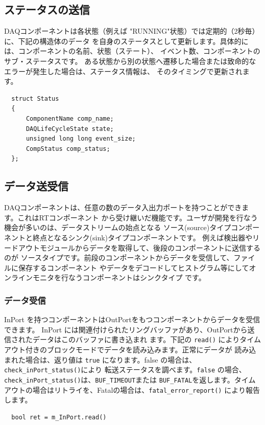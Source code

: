 \documentclass[a4j,10pt,dvips,onecolumn,oneside,final]{jarticle}%
\begin{document}
\subsection{ステータスの送信}
DAQコンポーネントは各状態（例えば "RUNNING"状態）では定期的（2秒毎）に、下記の構造体のデータ
を自身のステータスとして更新します。具体的には、コンポーネントの名前、状態（ステート）、
イベント数、コンポーネントのサブ・ステータスです。
ある状態から別の状態へ遷移した場合または致命的なエラーが発生した場合は、ステータス情報は、
そのタイミングで更新されます。

\begin{Verbatim}
  struct Status
  {
      ComponentName comp_name;
      DAQLifeCycleState state;
      unsigned long long event_size;
      CompStatus comp_status;
  };
\end{Verbatim}

\subsection{データ送受信}
DAQコンポーネントは、任意の数のデータ入出力ポートを持つことができます。これはRTコンポーネント
から受け継いだ機能です。ユーザが開発を行なう機会が多いのは、データストリームの始点となる
ソース(source)タイプコンポーネントと終点となるシンク(sink)タイプコンポーネントです。
例えば検出器やリードアウトモジュールからデータを取得して、後段のコンポーネントに送信するのが
ソースタイプです。前段のコンポーネントからデータを受信して、ファイルに保存するコンポーネント
やデータをデコードしてヒストグラム等にしてオンラインモニタを行なうコンポーネントはシンクタイプ
です。

\subsubsection{データ受信}
InPort を持つコンポーネントはOutPortをもつコンポーネントからデータを受信できます。
InPort には関連付けられたリングバッファがあり、OutPortから送信されたデータはこのバッファに書き込まれ
ます。下記の \verb|read()| によりタイムアウト付きのブロックモードでデータを読み込みます。正常にデータが
読み込まれた場合は、返り値は \verb|true| になります。false の場合は、\verb|check_inPort_status()|により
転送ステータスを調べます。\verb|false| の場合、\verb|check_inPort_status()|は、\verb|BUF_TIMEOUT|または
\verb|BUF_FATAL|を返します。タイムアウトの場合はリトライを、Fatalの場合は、\verb|fatal_error_report()|
により報告します。

\begin{Verbatim}
  bool ret = m_InPort.read()
\end{Verbatim}
\end{document}
